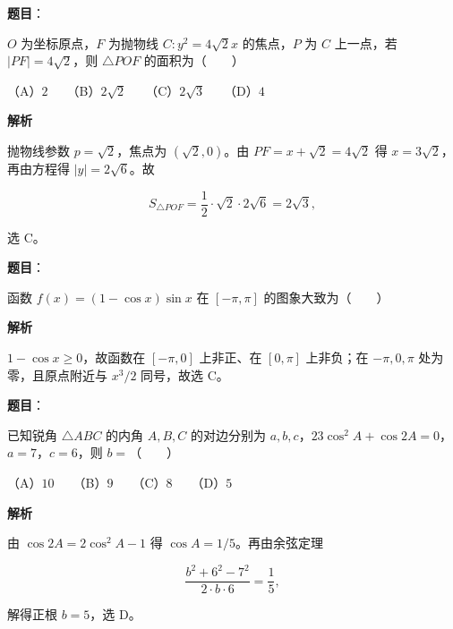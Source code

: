 \begin{answer}

\textbf{题目}：

$O$ 为坐标原点，$F$ 为抛物线 $C:y^2=4\sqrt2x$ 的焦点，$P$ 为 $C$ 上一点，若 $|PF|=4\sqrt2$，则 $\triangle POF$ 的面积为\mbox{（　　）}

（A）$2$　　（B）$2\sqrt2$　　（C）$2\sqrt3$　　（D）$4$

\textbf{解析}

抛物线参数 $p=\sqrt2$，焦点为 $(\sqrt2,0)$。由 $PF=x+\sqrt2=4\sqrt2$ 得 $x=3\sqrt2$，再由方程得 $|y|=2\sqrt6$。故

\nopagebreak[4]
\[
S_{\triangle POF}=\frac12\cdot\sqrt2\cdot2\sqrt6=2\sqrt3,
\]

选 C。


\end{answer}
\begin{answer}

\textbf{题目}：

函数 $f(x)=(1-\cos x)\sin x$ 在 $[-\pi,\pi]$ 的图象大致为\mbox{（　　）}
\nopagebreak[4]
\begin{center}\end{center}
\nopagebreak[4]
\textbf{解析}

$1-\cos x\geqslant0$，故函数在 $[-\pi,0]$ 上非正、在 $[0,\pi]$ 上非负；在 $-\pi,0,\pi$ 处为零，且原点附近与 $x^3/2$ 同号，故选 C。


\end{answer}
\begin{answer}

\textbf{题目}：

已知锐角 $\triangle ABC$ 的内角 $A,B,C$ 的对边分别为 $a,b,c$，$23\cos^2A+\cos2A=0$，$a=7$，$c=6$，则 $b=$\mbox{（　　）}

（A）$10$　　（B）$9$　　（C）$8$　　（D）$5$

\textbf{解析}

由 $\cos2A=2\cos^2A-1$ 得 $\cos A=1/5$。再由余弦定理

\nopagebreak[4]
\[
\frac{b^2+6^2-7^2}{2\cdot b\cdot6}=\frac15,
\]

解得正根 $b=5$，选 D。


\end{answer}
